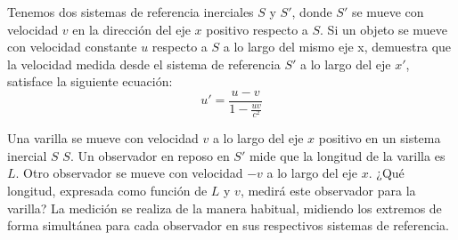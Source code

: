 \documentclass[12pt]{article}
\newenvironment{exercise}[2][Ejercicio]{\begin{trivlist} 
\item[\hskip \labelsep {\bfseries #1}\hskip \labelsep {\bfseries #2.}]}{\end{trivlist}}
\begin{document}
\begin{exercise}{1.4} 
Tenemos dos sistemas de referencia inerciales $S$ y $S'$, donde $S'$ se mueve con velocidad $v$ en la dirección del eje $x$ positivo respecto a $S$. Si un objeto se mueve con velocidad constante $u$ respecto a $S$ a lo largo del mismo eje x, demuestra que la velocidad medida desde el sistema de referencia $S'$ a lo largo del eje $x'$, satisface la siguiente ecuación:
\[
u' = \frac{u - v}{1 - \frac{u v}{c^2}}
\]
\end{exercise}

\begin{exercise}{1.5} 
Una varilla se mueve con velocidad $v$ a lo largo del eje $x$ positivo en un sistema inercial $S$
$S$. Un observador en reposo en $S'$ mide que la longitud de la varilla es $L$. Otro observador se 
mueve con velocidad $-v$ a lo largo del eje $x$. ¿Qué longitud, expresada como función de $L$ y $v$, medirá este observador para la varilla? La medición se realiza de la manera habitual, midiendo los extremos de forma simultánea para cada observador en sus respectivos sistemas de referencia.
\end{exercise}

 
\end{document}
